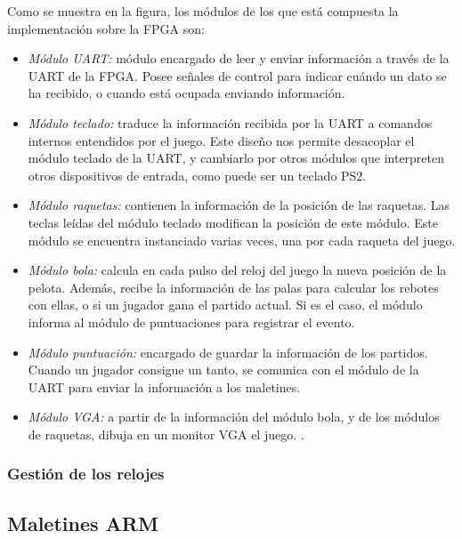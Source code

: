Como se muestra en la figura, los módulos de los que está compuesta la
implementación sobre la FPGA son:
\begin{itemize}
\item \emph{Módulo UART:} módulo encargado de leer y enviar información a
  través de la UART de la FPGA. Posee señales de control para indicar
  cuándo un dato se ha recibido, o cuando está ocupada enviando
  información.
\item \emph{Módulo teclado:} traduce la información recibida por la UART a
  comandos internos entendidos por el juego. Este diseño nos permite
  desacoplar el módulo teclado de la UART, y cambiarlo por otros módulos
  que interpreten otros dispositivos de entrada, como puede ser un teclado
  PS2.
\item \emph{Módulo raquetas:} contienen la información de la posición de
  las raquetas. Las teclas leídas del módulo teclado modifican la posición
  de este módulo. Este módulo se encuentra instanciado varias veces, una
  por cada raqueta del juego.
\item \emph{Módulo bola:} calcula en cada pulso del reloj del juego la
  nueva posición de la pelota. Además, recibe la información de las palas
  para calcular los rebotes con ellas, o si un jugador gana el partido
  actual. Si es el caso, el módulo informa al módulo de puntuaciones para
  registrar el evento.
\item \emph{Módulo puntuación:} encargado de guardar la información de los
  partidos. Cuando un jugador consigue un tanto, se comunica con el módulo
  de la UART para enviar la información a los maletines.
\item \emph{Módulo VGA:} a partir de la información del módulo bola, y de
  los módulos de raquetas, dibuja en un monitor VGA el juego. .
\end{itemize}

\subsubsection{Gestión de los relojes}
\label{s3:subsubsec:clocking}


\subsection{Maletines ARM}
\label{s3:subsec:maletines}
\\

